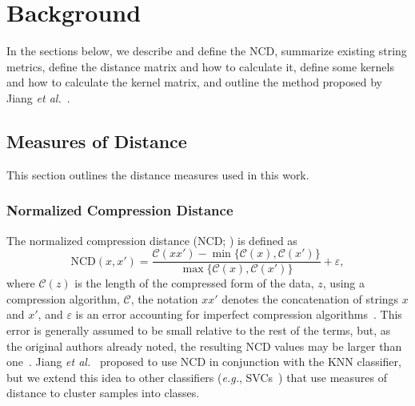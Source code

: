 \documentclass[preprint,12pt]{article}
\begin{document}
\section{Background}

In the sections below, we describe and define the NCD, summarize existing string metrics, define the distance matrix and how to calculate it, define some kernels and how to calculate the kernel matrix, and outline the method proposed by Jiang \textit{et al.}~\cite{jiang2022less}.



\subsection{Measures of Distance}

This section outlines the distance measures used in this work.





\subsubsection{Normalized Compression Distance}
\label{ncd}

The normalized compression distance (NCD; \cite{ncd}) is defined as
\begin{equation}
    \text{NCD}(x, x') = \frac{\mathcal{C}(xx') - \min\{\mathcal{C}(x), \mathcal{C}(x')\}}{\max\{\mathcal{C}(x), \mathcal{C}(x')\}} + \varepsilon,
\end{equation}
where $\mathcal{C}(z)$ is the length of the compressed form of the data, $z$, using a compression algorithm, $\mathcal{C}$, the notation $xx'$ denotes the concatenation of strings $x$ and $x'$, and $\varepsilon$ is an error accounting for imperfect compression algorithms~\cite{ncd}. This error is generally assumed to be small relative to the rest of the terms, but, as the original authors already noted, the resulting NCD values may be larger than one~\cite{ncd}.
Jiang \textit{et al.}~\cite{jiang2022less} proposed to use NCD in conjunction with the KNN classifier, but we extend this idea to other classifiers (\textit{e.g.}, SVCs~\cite{vapnik1994measuring}) that use measures of distance to cluster samples into classes.
\end{document}
